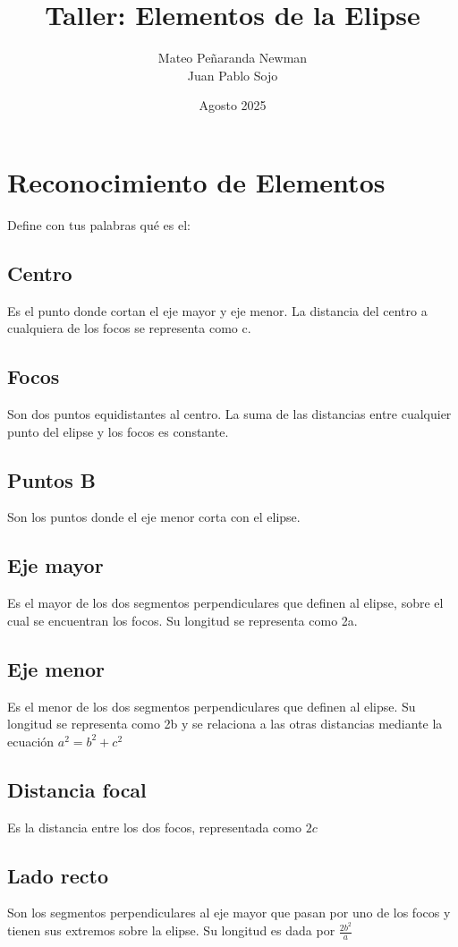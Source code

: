 \documentclass{article}
\begin{document}
\title{Taller: Elementos de la Elipse}
\author{Mateo Peñaranda Newman \\ Juan Pablo Sojo}
\date{Agosto 2025}
\maketitle

\section{Reconocimiento de Elementos}
Define con tus palabras qué es el:
\subsection{Centro}
Es el punto donde cortan el eje mayor y eje menor. La distancia del centro a cualquiera de los focos se representa como c.
\subsection{Focos}
Son dos puntos equidistantes al centro. La suma de las distancias entre cualquier punto del elipse y los focos es constante.
\subsection{Puntos B}
Son los puntos donde el eje menor corta con el elipse.
\subsection{Eje mayor}
Es el mayor de los dos segmentos perpendiculares que definen al elipse, sobre el cual se encuentran los focos. Su longitud se representa como 2a.
\subsection{Eje menor}
Es el menor de los dos segmentos perpendiculares que definen al elipse. Su longitud se representa como 2b y se relaciona a las otras distancias mediante la ecuación $a^2=b^2+c^2$
\subsection{Distancia focal}
Es la distancia entre los dos focos, representada como $2c$
\subsection{Lado recto}
Son los segmentos perpendiculares al eje mayor que pasan por uno de los focos y tienen sus extremos sobre la elipse. Su longitud es dada por $\frac{2b^2}{a}$
\end{document}
